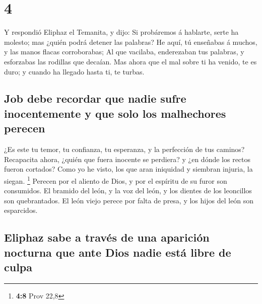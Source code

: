 \hypertarget{section-3}{%
\section{4}\label{section-3}}

 Y respondió Eliphaz el Temanita, y dijo: 
Si probáremos á hablarte, serte ha molesto; mas ¿quién podrá detener las
palabras?  He aquí, tú enseñabas á muchos, y las manos
flacas corroborabas;  Al que vacilaba, enderezaban tus
palabras, y esforzabas las rodillas que decaían.  Mas
ahora que el mal sobre ti ha venido, te es duro; y cuando ha llegado
hasta ti, te turbas.

\hypertarget{job-debe-recordar-que-nadie-sufre-inocentemente-y-que-solo-los-malhechores-perecen}{%
\subsection{Job debe recordar que nadie sufre inocentemente y que solo
los malhechores
perecen}\label{job-debe-recordar-que-nadie-sufre-inocentemente-y-que-solo-los-malhechores-perecen}}

 ¿Es este tu temor, tu confianza, tu esperanza, y la
perfección de tus caminos?  Recapacita ahora, ¿quién que
fuera inocente se perdiera? y ¿en dónde los rectos fueron cortados?
 Como yo he visto, los que aran iniquidad y siembran
injuria, la siegan. \footnote{\textbf{4:8} Prov 22,8} 
Perecen por el aliento de Dios, y por el espíritu de su furor son
consumidos.  El bramido del león, y la voz del león, y
los dientes de los leoncillos son quebrantados.  El león
viejo perece por falta de presa, y los hijos del león son esparcidos.

\hypertarget{eliphaz-sabe-a-travuxe9s-de-una-apariciuxf3n-nocturna-que-ante-dios-nadie-estuxe1-libre-de-culpa}{%
\subsection{Eliphaz sabe a través de una aparición nocturna que ante
Dios nadie está libre de
culpa}\label{eliphaz-sabe-a-travuxe9s-de-una-apariciuxf3n-nocturna-que-ante-dios-nadie-estuxe1-libre-de-culpa}}


